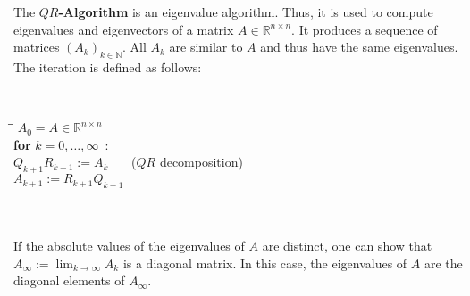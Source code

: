 %
The \textbf{$QR$-Algorithm} is an eigenvalue algorithm. Thus, it is used to compute eigenvalues and eigenvectors of a matrix $A \in \mathbb{R}^{n\times n}$. It produces a sequence of matrices $\left(A_{k}\right)_{k\in\mathbb{N}}$. All $A_k$ are similar to $A$ and thus have the same eigenvalues. The iteration is defined as follows:\\
\begin{minipage}{0.3\textwidth}
	~
\end{minipage}
\begin{minipage}[c]{0.6\textwidth}
	\vspace{0.2cm}
	\begin{tabbing}
		\qquad \= \qquad \= \qquad \kill
		$A_0=A \in \mathbb{R}^{n\times n}$\\
		\textbf{for} $k=0,\ldots ,\infty$\ : \\[0.3em]
		\> $Q_{k+1}R_{k+1}:=A_{k}$ ~~~{\small ($QR$ decomposition)} \\[0.3em]
		\> $A_{k+1}:=R_{k+1}Q_{k+1}$ 
	\end{tabbing}	 
\end{minipage}
~\\~\\
If the absolute values of the eigenvalues of $A$ are distinct, one can show that $A_\infty :=\lim_{k\to\infty} A_k$ is a diagonal matrix. In this case, the eigenvalues of $A$ are the diagonal elements of $A_\infty$.
 
